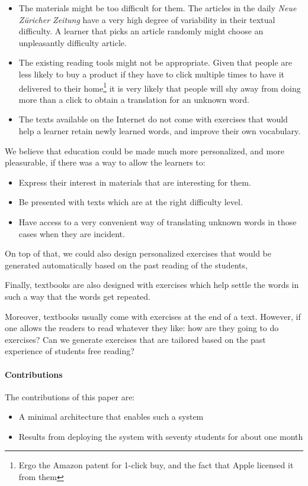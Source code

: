 \begin{itemize}
	
  \item The materials might be too difficult for them. The articles in the  daily {\em Neue Z\"uricher Zeitung} have a very high degree of variability in their textual difficulty. A learner that picks an article randomly might choose an unpleasantly difficulty article.

  \item The existing reading tools might not be appropriate. Given that people are less likely to buy a product if they have to click multiple times to have it delivered to their home\footnote{Ergo the Amazon patent for 1-click buy, and the fact that Apple licensed it from them} it is very likely that people will shy away from doing more than a click to obtain a translation for an unknown word.

  \item The texts available on the Internet do not come with exercises that would help a learner retain newly learned words, and improve their own vocabulary. 
  
\end{itemize}

We believe that education could be made much more personalized, and more pleasurable, if there was a way to allow the learners to:
\begin{itemize}
\item Express their interest in materials that are interesting for them.
\item Be presented with texts which are at the right difficulty level.
\item Have access to a very convenient way of translating unknown words in those cases when they are incident.
\end{itemize}

On top of that, we could also design personalized exercises that would be generated automatically based on the past reading of the students,

Finally, textbooks are also designed with exercises which help settle the words in such a way that the words get repeated.

Moreover, textbooks usually come with exercises at the end of a text. However, if one allows the readers to read whatever they like: how are they going to do exercises? Can we generate exercises that are tailored based on the past experience of students free reading?

\paragraph{Contributions}
The contributions of this paper are: 
\begin{itemize}
	\item A minimal architecture that enables such a system
	\item Results from deploying the system with seventy students for about one month
\end{itemize}
